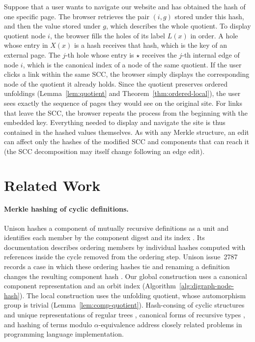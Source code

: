 \documentclass[twoside,leqno]{article}
\begin{document}
Suppose that a user wants to navigate our website and has obtained the hash of one specific page. The browser retrieves the pair $(i,g)$ stored under this hash, and then the value stored under $g$, which describes the whole quotient. To display quotient node $i$, the browser fills the holes of its label $L(x)$ in order. A hole whose entry in $X(x)$ is a hash receives that hash, which is the key of an external page. The $j$-th hole whose entry is $\star$ receives the $j$-th internal edge of node $i$, which is the canonical index of a node of the same quotient. If the user clicks a link within the same SCC, the browser simply displays the corresponding node of the quotient it already holds. Since the quotient preserves ordered unfoldings (Lemma~\ref{lem:quotient} and Theorem~\ref{thm:ordered-local}), the user sees exactly the sequence of pages they would see on the original site. For links that leave the SCC, the browser repeats the process from the beginning with the embedded key. Everything needed to display and navigate the site is thus contained in the hashed values themselves. As with any Merkle structure, an edit can affect only the hashes of the modified SCC and components that can reach it (the SCC decomposition may itself change following an edge edit).

\section{Related Work}
\label{sec:related}

\paragraph{Merkle hashing of cyclic definitions.} Unison hashes a component of mutually recursive definitions as a unit and identifies each member by the component digest and its index \cite{unison}. Its documentation describes ordering members by individual hashes computed with references inside the cycle removed from the ordering step. Unison issue~2787 records a case in which these ordering hashes tie and renaming a definition changes the resulting component hash \cite{unison2787}. Our global construction uses a canonical component representation and an orbit index (Algorithm~\ref{alg:digraph-node-hash}). The local construction uses the unfolding quotient, whose automorphism group is trivial (Lemma~\ref{lem:comp-quotient}). Hash-consing of cyclic structures and unique representations of regular trees \cite{mauborgne2000incremental,considine2000efficient}, canonical forms of recursive types \cite{gauthier2004numbering}, and hashing of terms modulo $\alpha$-equivalence \cite{maziarz2021hashing} address closely related problems in programming language implementation.
\end{document}
